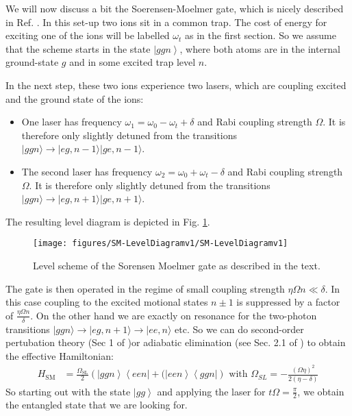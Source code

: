 \documentclass[10pt]{article}
\let\cite\citep
\providecommand\citep{\cite}
\newcommand{\bra}[1]{\ensuremath{\left\langle#1\right|}}
\newcommand{\ket}[1]{\ensuremath{\left|#1\right\rangle}}
\begin{document}
We will now discuss a bit the Soerensen-Moelmer gate, which is nicely described in Ref. \cite{S_rensen_2000}. In this set-up two ions sit in a common trap. The cost of energy for exciting one of the ions will be labelled $\omega_t$ as in the first section. So we assume that the scheme starts in the state $\ket{ggn}$, where both atoms are in the internal ground-state $g$ and in some excited trap level $n$.

In the next step, these two ions experience two lasers, which are coupling excited and the ground state of the ions:
\begin{itemize}
\item One laser has frequency $\omega_1=\omega_0-\omega_t+\delta$ and Rabi coupling strength $\Omega$. It is therefore only slightly detuned from the transitions $|ggn\rangle\rightarrow|eg,n-1\rangle |ge,n-1\rangle$.
\item The second laser has frequency $\omega_2=\omega_0+\omega_t-\delta$ and Rabi coupling strength $\Omega$. It is therefore only slightly detuned from the transitions $|ggn\rangle\rightarrow|eg,n+1\rangle |ge,n+1\rangle$.
\end{itemize}
The resulting level diagram is depicted in Fig. \ref{658942}.
\begin{figure}[h!]
\begin{center}
\texttt{[image: figures/SM-LevelDiagramv1/SM-LevelDiagramv1]}
\caption{{Level scheme of the Sorensen Moelmer gate as described in the text.
{\label{658942}}%
}}
\end{center}
\end{figure}

The gate is then operated in the regime of small coupling strength $\eta \Omega n \ll \delta$. In this case coupling to the excited motional states $n\pm 1$ is suppressed by a factor of $\frac{\eta \Omega n}{\delta}$. On the other hand we are exactly on resonance for the two-photon transitions $|ggn\rangle\rightarrow|eg,n+1\rangle\rightarrow|ee,n\rangle$ etc. So we can do second-order pertubation theory (Sec 1 of \cite{Jendrzejewskie})or adiabatic elimination (see Sec. 2.1 of \cite{Jendrzejewskic}) to obtain the effective Hamiltonian:
\begin{align}
H_\mathrm{SM} &= \frac{\Omega_\mathrm{SL}}{2}\left(\ket{ggn}\bra{een} + (\ket{een}\bra{ggn}\right)\text{ with }\Omega_{SL} = -\frac{(\Omega \eta)^2}{2(\eta - \delta)}
\end{align}
So starting out with the state $\ket{gg}$ and applying the laser for $t\Omega =\frac{\pi}{2}$, we obtain the entangled state that we are looking for. 
\end{document}
